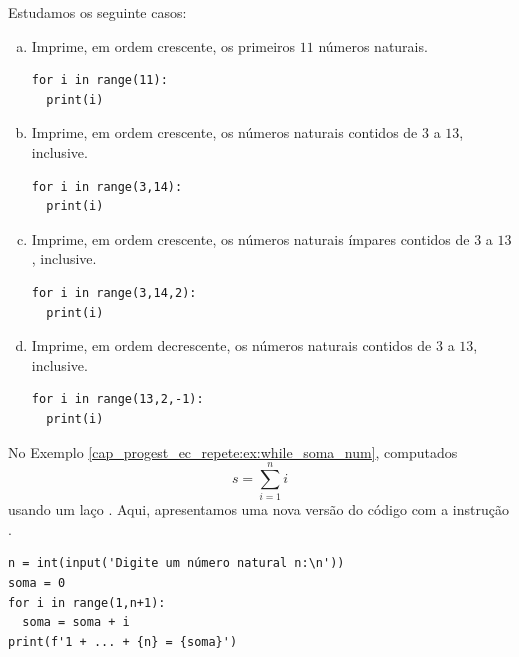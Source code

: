 \begin{ex}
  Estudamos os seguinte casos:
  \begin{enumerate}[a)]
  \item Imprime, em ordem crescente, os primeiros $11$ números naturais.

\begin{lstlisting}[xrightmargin=2.5em]
for i in range(11):
  print(i)
\end{lstlisting}

\item Imprime, em ordem crescente, os números naturais contidos de $3$ a $13$, inclusive.

\begin{lstlisting}[xrightmargin=2.5em]
for i in range(3,14):
  print(i)
\end{lstlisting}

\item Imprime, em ordem crescente, os números naturais ímpares contidos de $3$ a $13$, inclusive.

\begin{lstlisting}[xrightmargin=2.5em]
for i in range(3,14,2):
  print(i)
\end{lstlisting}

\item Imprime, em ordem decrescente, os números naturais contidos de $3$ a $13$, inclusive.

\begin{lstlisting}[xrightmargin=2.5em]
for i in range(13,2,-1):
  print(i)
\end{lstlisting}

\end{enumerate}

\end{ex}

\begin{ex}\label{cap_progest_ec_repete:ex:for_soma_num}
  No Exemplo \ref{cap_progest_ec_repete:ex:while_soma_num}, computados
  \begin{equation}
    s = \sum_{i=1}^n i
  \end{equation}
  usando um laço {\PYTHONwhile}. Aqui, apresentamos uma nova versão do código com a instrução {\PYTHONfor}.

\begin{lstlisting}
n = int(input('Digite um número natural n:\n'))
soma = 0
for i in range(1,n+1):
  soma = soma + i
print(f'1 + ... + {n} = {soma}')
\end{lstlisting}

\end{ex}

